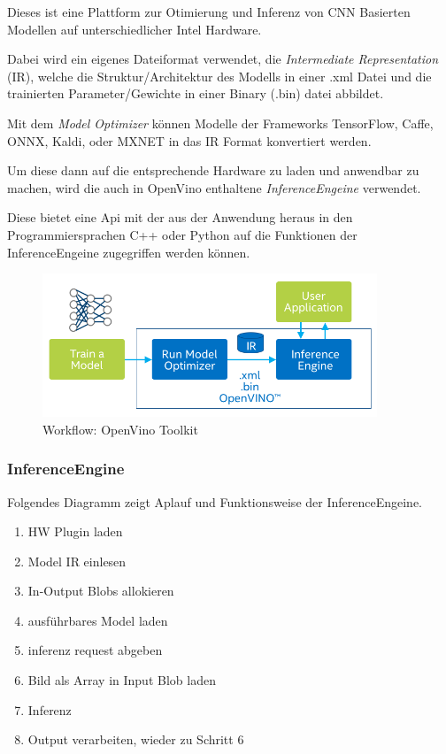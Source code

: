 Dieses ist eine Plattform zur Otimierung und Inferenz von 
CNN Basierten Modellen auf unterschiedlicher Intel Hardware.

Dabei wird ein eigenes Dateiformat verwendet, die \textit{Intermediate 
Representation} (IR), welche die Struktur/Architektur des Modells 
in einer .xml Datei und die trainierten Parameter/Gewichte in 
einer Binary (.bin) datei abbildet.

Mit dem \textit{Model Optimizer} können Modelle der Frameworks 
TensorFlow, Caffe, ONNX, Kaldi, oder MXNET in das IR Format 
konvertiert werden.

Um diese dann auf die entsprechende Hardware zu laden und anwendbar 
zu machen, wird die auch in OpenVino enthaltene \textit{InferenceEngeine}
verwendet.

Diese bietet eine Api mit der aus der Anwendung heraus in den 
Programmiersprachen C++ oder Python auf die Funktionen der 
InferenceEngeine zugegriffen werden können.

\begin{figure}[htb]
    \centering
    \includegraphics[width=10cm]{./Bilder/open_vino_workflow_steps.png}
    \caption{Workflow: OpenVino Toolkit}
    \label{img:openvinoworkflow}
\end{figure}

\subsubsection{InferenceEngine}

Folgendes Diagramm zeigt Aplauf und Funktionsweise der InferenceEngeine.

\begin{enumerate}
    \item HW Plugin laden
    \item Model IR einlesen
    \item In-Output Blobs allokieren 
    \item ausführbares Model laden
    \item inferenz request abgeben
    \item Bild als Array in Input Blob laden
    \item Inferenz
    \item Output verarbeiten, wieder zu Schritt 6
\end{enumerate}

